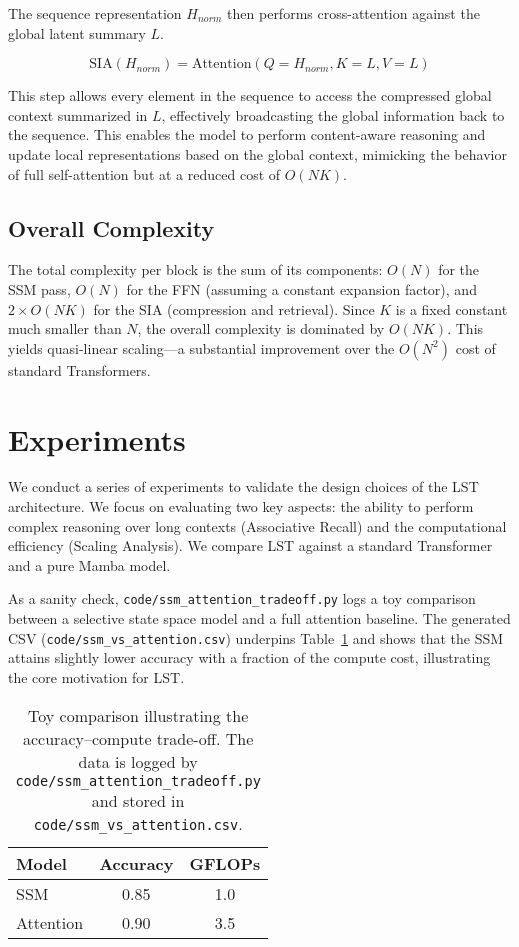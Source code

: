 \documentclass[10pt,twocolumn,letterpaper]{article}
\begin{document}
The sequence representation \(H_{norm}\) then performs cross-attention against the global latent summary \(L\).

\begin{equation}
\text{SIA}(H_{norm}) = \text{Attention}(Q=H_{norm}, K=L, V=L)
\end{equation}

This step allows every element in the sequence to access the compressed global context summarized in \(L\), effectively broadcasting the global information back to the sequence. This enables the model to perform content-aware reasoning and update local representations based on the global context, mimicking the behavior of full self-attention but at a reduced cost of \(O(NK)\).

\subsection{Overall Complexity}

The total complexity per block is the sum of its components: \(O(N)\) for the SSM pass, \(O(N)\) for the FFN (assuming a constant expansion factor), and \(2\times O(NK)\) for the SIA (compression and retrieval). Since \(K\) is a fixed constant much smaller than \(N\), the overall complexity is dominated by \(O(NK)\). This yields quasi-linear scaling—a substantial improvement over the \(O(N^{2})\) cost of standard Transformers.

\section{Experiments}

We conduct a series of experiments to validate the design choices of the LST architecture. We focus on evaluating two key aspects: the ability to perform complex reasoning over long contexts (Associative Recall) and the computational efficiency (Scaling Analysis). We compare LST against a standard Transformer and a pure Mamba model.

As a sanity check, \texttt{code/ssm\_attention\_tradeoff.py} logs a toy comparison between a selective state space model and a full attention baseline. The generated CSV (\texttt{code/ssm\_vs\_attention.csv}) underpins Table~\ref{tab:ssm_attn_tradeoff} and shows that the SSM attains slightly lower accuracy with a fraction of the compute cost, illustrating the core motivation for LST.

\begin{table}[h]
\centering
\begin{tabular}{@{}lcc@{}}
\toprule
Model & Accuracy & GFLOPs \\
\midrule
SSM & 0.85 & 1.0 \\
Attention & 0.90 & 3.5 \\
\bottomrule
\end{tabular}
\caption{Toy comparison illustrating the accuracy--compute trade-off. The data is logged by \texttt{code/ssm\_attention\_tradeoff.py} and stored in \texttt{code/ssm\_vs\_attention.csv}.}
\label{tab:ssm_attn_tradeoff}
\end{table}
\end{document}
